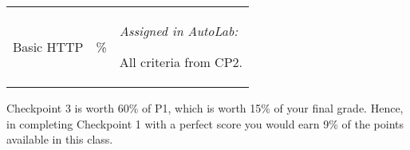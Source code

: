 \begin{center}
\begin{tabular}{>{\centering\arraybackslash}m{1in}>{\centering\arraybackslash}m{1in}p{3in}}
  \hline
  \addlinespace[5pt]

  Basic HTTP&40\%&\vspace{-10pt} 
                              {\it Assigned in AutoLab:}
                              \begin{packed_itemize}
                                \item All criteria from CP2.
                              \end{packed_itemize}\\

\end{tabular}
\end{center}


\noindent Checkpoint 3 is worth 60\% of P1, which is worth 15\% of your final grade. Hence, in completing Checkpoint 1 with a perfect score you would earn 9\% of the points available in this class.

